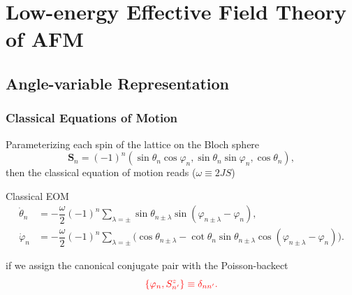 \documentclass[10pt,aspectratio=43,xcolor=x11names,t]{beamer}%
\begin{document}
\section{Low-energy Effective Field Theory of AFM}
	\subsection{Angle-variable Representation}
		\begin{frame}\frametitle{Classical Equations of Motion}
			Parameterizing each spin of the lattice on the Bloch sphere 
			\begin{equation*}
				\bm{S}_n=(-1)^n(\sin\theta_n\cos\varphi_n,\sin\theta_n\sin\varphi_n,\cos\theta_n),
			\end{equation*}
			then the classical equation of motion reads ($\omega\equiv 2JS$)
			\begin{block}{Classical EOM}
				\begin{align*}
					\dot{\theta}_n&=-\dfrac{\omega}{2}(-1)^n\sum_{\lambda=\pm}\sin\theta_{n\pm\lambda}\sin(\varphi_{n\pm\lambda}-\varphi_n),\\
					\dot{\varphi}_n&=-\dfrac{\omega}{2}(-1)^n\sum_{\lambda=\pm}\big(\cos\theta_{n\pm\lambda}-\cot\theta_n\sin\theta_{n\pm\lambda}\cos(\varphi_{n\pm\lambda}-\varphi_n)\bigg).
				\end{align*}
			\end{block}
			if we assign the canonical conjugate pair with the Poisson-backect
			\begin{equation*}
				\color{red}\{\varphi_n,S_{n'}^z\}\equiv\delta_{nn'}.
			\end{equation*}
		\end{frame}
		
\end{document}
